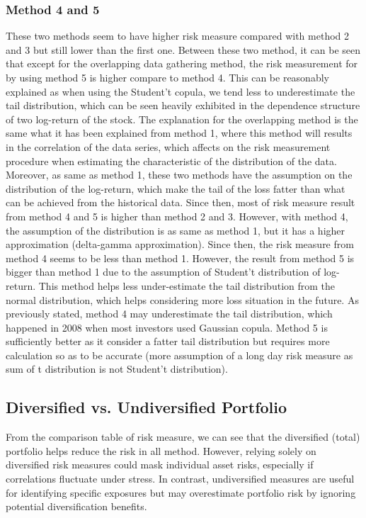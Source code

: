 \subsubsection{Method 4 and 5}
These two methods seem to have higher risk measure compared with method 2 and 3 but still lower than the first one. Between these two method, it can be seen that except for the overlapping data gathering method, the risk measurement for by using method 5 is higher compare to method 4. This can be reasonably explained as when using the Student't copula, we tend less to underestimate the tail distribution, which can be seen heavily exhibited in the dependence structure of two log-return of the stock. The explanation for the overlapping method is the same what it has been explained from method 1, where this method will results in the correlation of the data series, which affects on the risk measurement procedure when estimating the characteristic of the distribution of the data. Moreover, as same as method 1, these two methods have the assumption on the distribution of the log-return, which make the tail of the loss fatter than what can be achieved from the historical data. Since then, most of risk measure result from method 4 and 5 is higher than method 2 and 3. However, with method 4, the assumption of the distribution is as same as method 1, but it has a higher approximation (delta-gamma approximation). Since then, the risk measure from method 4 seems to be less than method 1. However, the result from method 5 is bigger than method 1 due to the assumption of Student't distribution of log-return. This method helps less under-estimate the tail distribution from the normal distribution, which helps considering more loss situation in the future. As previously stated, method 4 may underestimate the tail distribution, which happened in 2008 when most investors used Gaussian copula. Method 5 is sufficiently better as it consider a fatter tail distribution but requires more calculation so as to be accurate (more assumption of a long day risk measure as sum of t distribution is not Student't distribution).
\subsection{Diversified vs. Undiversified Portfolio}
From the comparison table of risk measure, we can see that the diversified (total) portfolio helps reduce the risk in all method. However, relying solely on diversified risk measures could mask individual asset risks, especially if correlations fluctuate under stress. In contrast, undiversified measures are useful for identifying specific exposures but may overestimate portfolio risk by ignoring potential diversification benefits.
